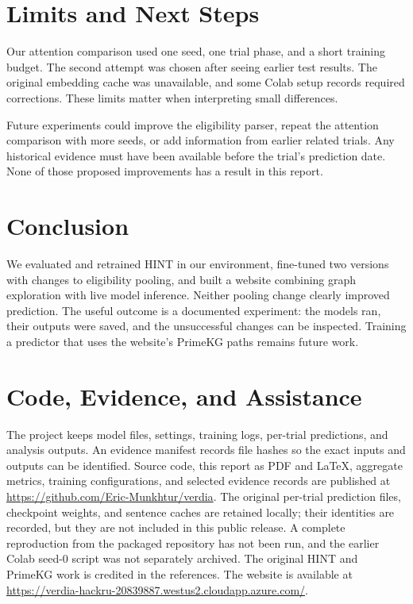 \documentclass[10pt,letterpaper]{article}
\begin{document}
\section{Limits and Next Steps}
Our attention comparison used one seed, one trial phase, and a short training budget. The second attempt was chosen after seeing earlier test results. The original embedding cache was unavailable, and some Colab setup records required corrections. These limits matter when interpreting small differences.

Future experiments could improve the eligibility parser, repeat the attention comparison with more seeds, or add information from earlier related trials. Any historical evidence must have been available before the trial's prediction date. None of those proposed improvements has a result in this report.

\section{Conclusion}
We evaluated and retrained HINT in our environment, fine-tuned two versions with changes to eligibility pooling, and built a website combining graph exploration with live model inference. Neither pooling change clearly improved prediction. The useful outcome is a documented experiment: the models ran, their outputs were saved, and the unsuccessful changes can be inspected. Training a predictor that uses the website's PrimeKG paths remains future work.

\section*{Code, Evidence, and Assistance}
The project keeps model files, settings, training logs, per-trial predictions, and analysis outputs. An evidence manifest records file hashes so the exact inputs and outputs can be identified. Source code, this report as PDF and LaTeX, aggregate metrics, training configurations, and selected evidence records are published at \url{https://github.com/Eric-Munkhtur/verdia}. The original per-trial prediction files, checkpoint weights, and sentence caches are retained locally; their identities are recorded, but they are not included in this public release. A complete reproduction from the packaged repository has not been run, and the earlier Colab seed-0 script was not separately archived. The original HINT and PrimeKG work is credited in the references. The website is available at \url{https://verdia-hackru-20839887.westus2.cloudapp.azure.com/}.
\end{document}
